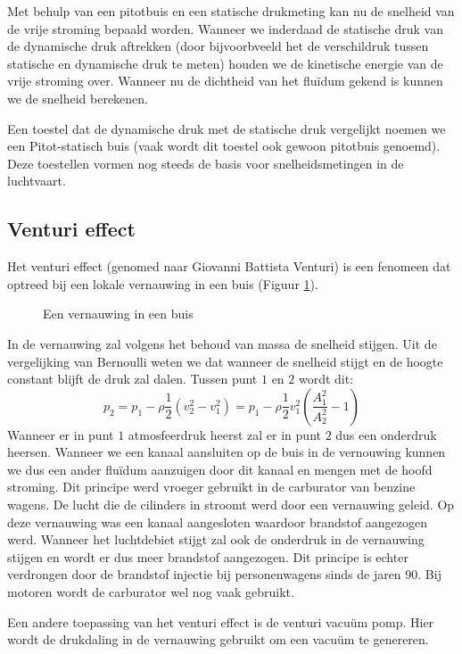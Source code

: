 Met behulp van een pitotbuis en een statische drukmeting kan nu de snelheid van de vrije stroming bepaald worden. Wanneer we inderdaad de statische druk van de dynamische druk aftrekken (door bijvoorbveeld het de verschildruk tussen statische en dynamische druk te meten) houden we de kinetische energie van de vrije stroming over. Wanneer nu de dichtheid van het fluïdum gekend is kunnen we de snelheid berekenen.

Een toestel dat de dynamische druk met de statische druk vergelijkt noemen we een Pitot-statisch buis (vaak wordt dit toestel ook gewoon pitotbuis genoemd). Deze toestellen vormen nog steeds de basis voor snelheidsmetingen in de luchtvaart. 

		\subsection{Venturi effect}
Het venturi effect (genomed naar Giovanni Battista Venturi) is een fenomeen dat optreed bij een lokale vernauwing in een buis (Figuur \ref{fig:venturi}).
\begin{figure}[htb]
	\centering
	
	\caption{Een vernauwing in een buis}
	\label{fig:venturi}
\end{figure}
In de vernauwing zal volgens het behoud van massa de snelheid stijgen. Uit de vergelijking van Bernoulli weten we dat wanneer de snelheid stijgt en de hoogte constant blijft de druk zal dalen. Tussen punt $1$ en $2$ wordt dit:
\begin{equation}
	p_2 = p_1 - \rho \frac{1}{2}\left(v_2^2-v_1^2\right) = p_1 - \rho \frac{1}{2} v_1^2 \left(\frac{A_1^2}{A_2^2}-1\right)
\end{equation}
Wanneer er in punt $1$ atmosfeerdruk heerst zal er in punt $2$ dus een onderdruk heersen. Wanneer we een kanaal aansluiten op de buis in de vernouwing kunnen we dus een ander fluïdum aanzuigen door dit kanaal en mengen met de hoofd stroming. Dit principe werd vroeger gebruikt in de carburator van benzine wagens. De lucht die de cilinders in stroomt werd door een vernauwing geleid. Op deze vernauwing was een kanaal aangesloten waardoor brandstof aangezogen werd. Wanneer het luchtdebiet stijgt zal ook de onderdruk in de vernauwing stijgen en wordt er dus meer brandstof aangezogen. Dit principe is echter verdrongen door de brandstof injectie bij personenwagens sinds de jaren 90. Bij motoren wordt de carburator wel nog vaak gebruikt.

Een andere toepassing van het venturi effect is de venturi vacu\"um pomp. Hier wordt de drukdaling in de vernauwing gebruikt om een vacu\"um te genereren. 

